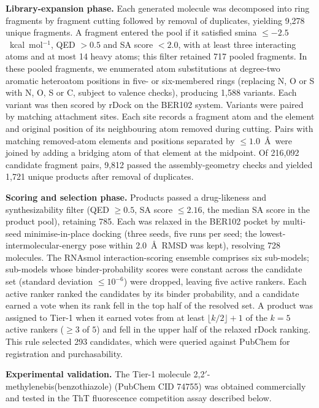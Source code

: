 \documentclass[pdflatex,sn-mathphys-num]{sn-jnl}
\theoremstyle{thmstyleone}
\theoremstyle{thmstyletwo}
\theoremstyle{thmstylethree}
\begin{document}
\medskip
\noindent\textbf{Library-expansion phase.} Each generated molecule was decomposed into ring fragments by fragment cutting followed by removal of duplicates, yielding 9,278 unique fragments. A fragment entered the pool if it satisfied smina $\leq -2.5$~kcal~mol$^{-1}$, QED $> 0.5$ and SA score $< 2.0$, with at least three interacting atoms and at most 14 heavy atoms; this filter retained 717 pooled fragments. In these pooled fragments, we enumerated atom substitutions at degree-two aromatic heteroatom positions in five- or six-membered rings (replacing N, O or S with N, O, S or C, subject to valence checks), producing 1,588 variants. Each variant was then scored by rDock \cite{ruizcarmona2014rdock} on the BER102 system. Variants were paired by matching attachment sites. Each site records a fragment atom and the element and original position of its neighbouring atom removed during cutting. Pairs with matching removed-atom elements and positions separated by $\leq1.0$~\AA\ were joined by adding a bridging atom of that element at the midpoint. Of 216,092 candidate fragment pairs, 9,812 passed the assembly-geometry checks and yielded 1,721 unique products after removal of duplicates.

\medskip
\noindent\textbf{Scoring and selection phase.} Products passed a drug-likeness and synthesizability filter (QED $\geq 0.5$, SA score $\leq 2.16$, the median SA score in the product pool), retaining 785. Each was relaxed in the BER102 pocket by multi-seed minimise-in-place docking (three seeds, five runs per seed; the lowest-intermolecular-energy pose within 2.0~\AA\ RMSD was kept), resolving 728 molecules. The RNAsmol interaction-scoring ensemble \cite{ma2025rnasmol} comprises six sub-models; sub-models whose binder-probability scores were constant across the candidate set (standard deviation $\leq 10^{-6}$) were dropped, leaving five active rankers. Each active ranker ranked the candidates by its binder probability, and a candidate earned a vote when its rank fell in the top half of the resolved set. A product was assigned to Tier-1 when it earned votes from at least $\lfloor k/2\rfloor+1$ of the $k=5$ active rankers ($\geq3$ of $5$) and fell in the upper half of the relaxed rDock ranking. This rule selected 293 candidates, which were queried against PubChem for registration and purchasability.

\medskip
\noindent\textbf{Experimental validation.} The Tier-1 molecule 2,2$'$-methylenebis(benzothiazole) (PubChem CID 74755) was obtained commercially and tested in the ThT fluorescence competition assay described below.
\end{document}
